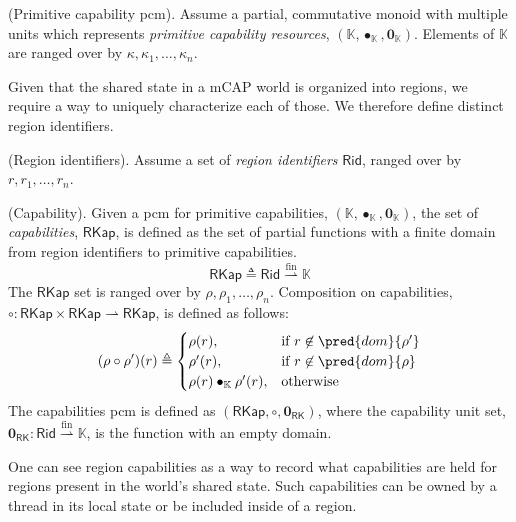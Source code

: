 \begin{param}
	(Primitive capability pcm).
	Assume a partial, commutative monoid with multiple units which represents \emph{primitive capability resources}, $(\mathbb{K}, \bullet_\mathbb{K}, \mathbf{0}_\mathbb{K})$. Elements of $\mathbb{K}$ are ranged over by $\kappa, \kappa_1, \ldots, \kappa_n$.
\end{param}

Given that the shared state in a mCAP world is organized into regions, we require a way to uniquely characterize each of those. We therefore define distinct region identifiers.
\begin{defn}
	(Region identifiers).
	Assume a set of \emph{region identifiers} $\mathsf{Rid}$, ranged over by $r, r_1, \ldots, r_n$.
\end{defn}

\begin{defn}
	(Capability).
	Given a pcm for primitive capabilities, $(\mathbb{K}, \bullet_\mathbb{K}, \mathbf{0}_\mathbb{K})$, the set of \emph{capabilities}, $\mathsf{RKap}$, is defined as the set of partial functions with a finite domain from region identifiers to primitive capabilities.
	\[
		\mathsf{RKap} \triangleq \mathsf{Rid} \overset{\text{fin}}{\rightharpoonup} \mathbb{K}
	\]
	The $\mathsf{RKap}$ set is ranged over by $\rho, \rho_1, \ldots, \rho_n$. Composition on capabilities, $\circ : \mathsf{RKap} \times \mathsf{RKap} \rightharpoonup \mathsf{RKap}$, is defined as follows:
	\[
		(\rho \circ \rho') (r)
			\triangleq
		\begin{cases}
			\rho(r), & \text{if } r \not\in \pred{dom}{\rho'}
			\\
			\rho'(r), & \text{if } r \not\in \pred{dom}{\rho}
			\\
			\rho(r) \bullet_\mathbb{K} \rho'(r), & \text{otherwise}
		\end{cases}
	\]
	The capabilities pcm is defined as $(\mathsf{RKap}, \circ, \mathbf{0}_{\mathsf{RK}})$, where the capability unit set, $\mathbf{0}_{\mathsf{RK}} : \mathsf{Rid} \overset{\text{fin}}{\rightharpoonup} \mathbb{K}$, is the function with an empty domain. 
\end{defn}
One can see region capabilities as a way to record what capabilities are held for regions present in the world's shared state. Such capabilities can be owned by a thread in its local state or be included inside of a region.

